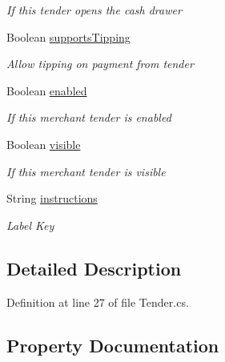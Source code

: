 \begin{DoxyCompactItemize}
\begin{DoxyCompactList}\small\item\em If this tender opens the cash drawer \end{DoxyCompactList}\item 
Boolean \hyperlink{classcom_1_1clover_1_1sdk_1_1v3_1_1base___1_1_tender_a908bac8871d58d1cc29f5ca1c8a022cc}{supports\+Tipping}
\begin{DoxyCompactList}\small\item\em Allow tipping on payment from tender \end{DoxyCompactList}\item 
Boolean \hyperlink{classcom_1_1clover_1_1sdk_1_1v3_1_1base___1_1_tender_a2fc29dbf52846a2d7e2e79fddc178fb3}{enabled}
\begin{DoxyCompactList}\small\item\em If this merchant tender is enabled \end{DoxyCompactList}\item 
Boolean \hyperlink{classcom_1_1clover_1_1sdk_1_1v3_1_1base___1_1_tender_ad1d373010d994888c0fda0e9b4a1f206}{visible}
\begin{DoxyCompactList}\small\item\em If this merchant tender is visible \end{DoxyCompactList}\item 
String \hyperlink{classcom_1_1clover_1_1sdk_1_1v3_1_1base___1_1_tender_a4d7b9fbb6b98db7a35e046179abc4f1a}{instructions}
\begin{DoxyCompactList}\small\item\em Label Key \end{DoxyCompactList}\end{DoxyCompactItemize}


\subsection{Detailed Description}


Definition at line 27 of file Tender.\+cs.



\subsection{Property Documentation}
\mbox{\label{classcom_1_1clover_1_1sdk_1_1v3_1_1base___1_1_tender_a1a267d95c2d3bbf07caa8b6aaa30eb7c}} 
